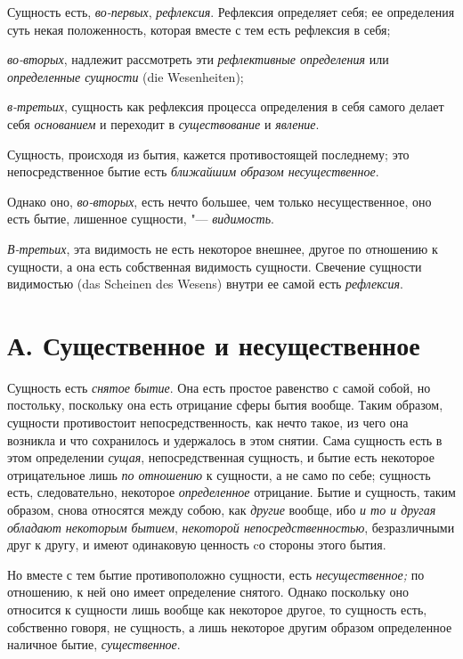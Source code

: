 Сущность есть, {\em во-первых}, {\em рефлексия}. Рефлексия определяет себя;
ее определения суть некая положенность, которая вместе с тем есть
рефлексия в себя;

{\em во-вторых}, надлежит рассмотреть эти {\em рефлективные определения} или
{\em определенные сущности} (die Wesenheiten);

{\em в-третьих}, сущность как рефлексия процесса
определения в себя самого делает себя {\em основанием}
и переходит в {\em существование} и {\em явление}.


Сущность, происходя из бытия, кажется
противостоящей последнему; это непосредственное бытие есть
{\em ближайшим образом несущественное}.

Однако оно, {\em во-вторых}, есть нечто большее, чем только
несущественное, оно есть бытие, лишенное сущности, "--- {\em видимость}.

{\em В-третьих}, эта видимость не есть некоторое
внешнее, другое по отношению к сущности, а она есть собственная видимость
сущности. Свечение сущности видимостью (das Scheinen des Wesens) внутри ее
самой есть {\em рефлексия}.

\section[А. Существенное и несущественное]{А. Существенное и несущественное}

Сущность есть {\em снятое
бытие}. Она есть простое равенство с самой собой, но постольку, поскольку
она есть отрицание сферы бытия вообще. Таким образом, сущности противостоит
непосредственность, как нечто такое, из чего она возникла и что сохранилось
и удержалось в этом снятии. Сама сущность есть в этом определении
{\em сущая}, непосредственная сущность, и бытие есть
некоторое отрицательное лишь {\em по отношению} к
сущности, а не само по себе; сущность есть, следовательно, некоторое
{\em определенное} отрицание. Бытие и сущность, таким
образом, снова относятся между собою, как {\em другие}
вообще, ибо {\em и то и другая обладают некоторым
бытием}, {\em некоторой непосредственностью}, безразличными друг к другу,
и имеют одинаковую ценность cо стороны этого бытия.

Но вместе с тем бытие противоположно сущности, есть
{\em несущественное;} по отношению, к ней оно имеет
определение снятого. Однако поскольку оно относится к сущности лишь вообще
как некоторое другое, то сущность есть, собственно говоря, не сущность, а
лишь некоторое другим образом определенное наличное бытие,
{\em существенное}.

